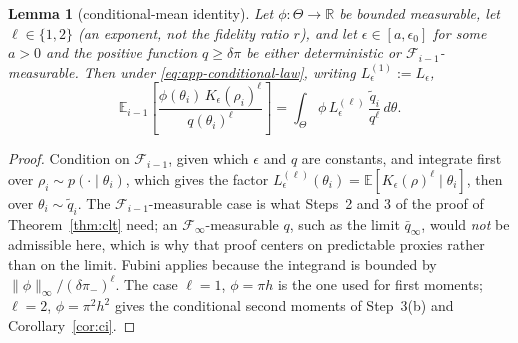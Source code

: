 \documentclass[10pt]{article}
\theoremstyle{plain}
\newtheorem{lemma}[theorem]{Lemma}
\theoremstyle{definition}
\begin{document}
\begin{lemma}[conditional-mean identity]\label{lem:condmean}
Let $\phi:\Theta\to\mathbb{R}$ be bounded measurable, let $\ell\in\{1,2\}$ (an exponent, not the fidelity ratio $r$), and let $\epsilon\in[a,\epsilon_0]$ for some $a>0$ and the positive function $q\ge\delta\pi$ be either deterministic or $\mathcal{F}_{i-1}$-measurable. Then under \eqref{eq:app-conditional-law}, writing $L^{(1)}_\epsilon:=L_\epsilon$,
\[
\mathbb{E}_{i-1}\!\left[\frac{\phi(\theta_i)\,K_\epsilon(\rho_i)^{\ell}}{q(\theta_i)^{\ell}}\right]
=\int_\Theta \phi\,L^{(\ell)}_\epsilon\,\frac{\tilde q_i}{q^{\ell}}\,d\theta .
\]
\end{lemma}
\begin{proof}
Condition on $\mathcal{F}_{i-1}$, given which $\epsilon$ and $q$ are constants, and integrate first over $\rho_i\sim p(\cdot\mid\theta_i)$, which gives the factor $L^{(\ell)}_\epsilon(\theta_i)=\mathbb{E}[K_\epsilon(\rho)^\ell\mid\theta_i]$, then over $\theta_i\sim\tilde q_i$. The $\mathcal{F}_{i-1}$-measurable case is what Steps~2 and 3 of the proof of Theorem~\ref{thm:clt} need; an $\mathcal{F}_\infty$-measurable $q$, such as the limit $\bar q_\infty$, would \emph{not} be admissible here, which is why that proof centers on predictable proxies rather than on the limit. Fubini applies because the integrand is bounded by $\|\phi\|_\infty/(\delta\pi_-)^{\ell}$. The case $\ell=1$, $\phi=\pi h$ is the one used for first moments; $\ell=2$, $\phi=\pi^2h^2$ gives the conditional second moments of Step~3(b) and Corollary~\ref{cor:ci}.
\end{proof}
\end{document}
